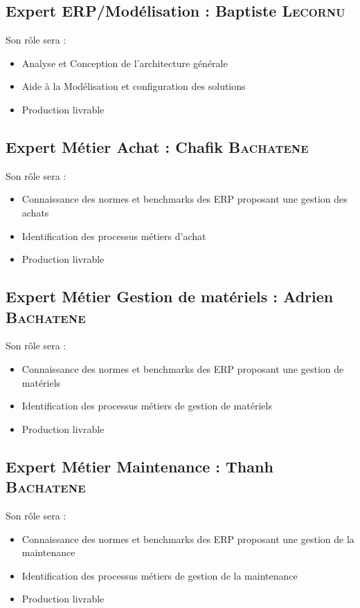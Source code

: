 \subsection{Expert ERP/Modélisation : Baptiste \textsc{Lecornu}}

Son rôle sera :
\begin{itemize}
    \item Analyse et Conception de l’architecture générale
    \item Aide à la Modélisation et configuration des solutions 
    \item Production livrable
\end{itemize}


\subsection{Expert Métier Achat : Chafik \textsc{Bachatene}}

Son rôle sera :
\begin{itemize}
    \item Connaissance des normes et benchmarks des ERP proposant une gestion des achats
    \item Identification des processus métiers d'achat
    \item Production livrable
\end{itemize}

\subsection{Expert Métier Gestion de matériels : Adrien \textsc{Bachatene}}

Son rôle sera :
\begin{itemize}
    \item Connaissance des normes et benchmarks des ERP proposant une gestion de matériels
    \item Identification des processus métiers de gestion de matériels
    \item Production livrable
\end{itemize}

\subsection{Expert Métier Maintenance : Thanh \textsc{Bachatene}}

Son rôle sera :
\begin{itemize}
    \item Connaissance des normes et benchmarks des ERP proposant une gestion de la maintenance
    \item Identification des processus métiers de gestion de la maintenance
    \item Production livrable
\end{itemize}

